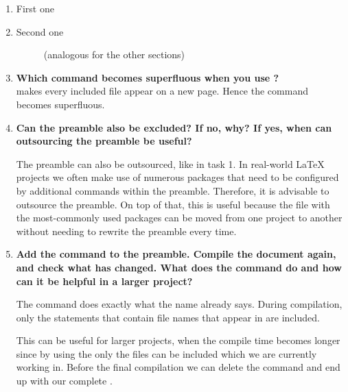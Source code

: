 \begin{enumerate}
	\item First one
	\begin{figure}[H]
		\caption{}
	\end{figure}
	\item Second one
	\begin{figure}[H]
		 \caption{ (analogous for the other 
			sections)}
	\end{figure}
 	\item \textbf{Which command becomes superfluous when you use 
	?} \\
	 makes every included file appear on a 
	new page. Hence the command  becomes 
	superfluous.
	
	\item \textbf{Can the preamble also be excluded? If no, why? If yes, when 
	can outsourcing the preamble be useful?} 

	 The preamble can also be outsourced, like in task 1. In real-world 
	 \LaTeX{} projects we often make use of numerous packages that need to be 
	 configured by additional commands within the preamble. Therefore, it is 
	 advisable to outsource the preamble. On top of that, this is useful 
	 because the file with the most-commonly used packages can be moved from 
	 one project to another without needing to rewrite the preamble every time.
	 
	\item 
	\textbf{Add the command  to the preamble. Compile the document again, and 
	check what has changed. What does the command do and how can it be helpful 
	in a larger project? }

	The command  does 
	exactly what the name already says. During compilation, only the 
	 statements that contain file names 
	that appear in  
	are included.
	
	This can be useful for larger projects, when the compile time becomes 
	longer since by using the  only the 
	files can be included which we are currently working in. Before the final 
	compilation we can delete the  
	command and end up with our complete .
\end{enumerate}